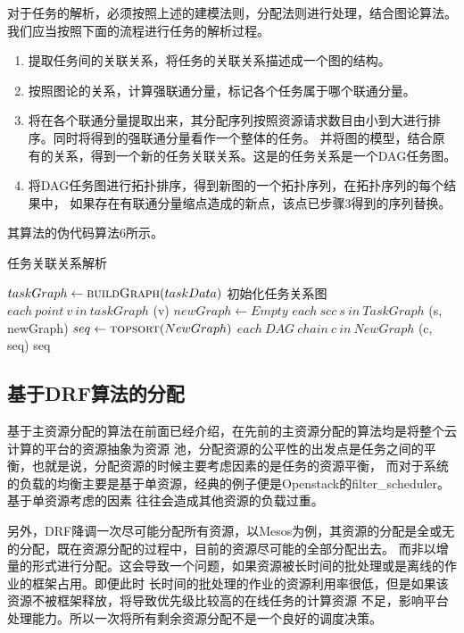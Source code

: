 对于任务的解析，必须按照上述的建模法则，分配法则进行处理，结合图论算法。我们应当按照下面的流程进行任务的解析过程。
\begin{enumerate}
\item 提取任务间的关联关系，将任务的关联关系描述成一个图的结构。
\item 按照图论的关系，计算强联通分量，标记各个任务属于哪个联通分量。
\item 将在各个联通分量提取出来，其分配序列按照资源请求数目由小到大进行排序。同时将得到的强联通分量看作一个整体的任务。
并将图的模型，结合原有的关系，得到一个新的任务关联关系。这是的任务关系是一个DAG任务图。
\item 将DAG任务图进行拓扑排序，得到新图的一个拓扑序列，在拓扑序列的每个结果中，
如果存在有联通分量缩点造成的新点，该点已步骤3得到的序列替换。
\end{enumerate}
其算法的伪代码算法6所示。
\begin{algorithm} 
\caption {任务关联关系解析} 
\begin{codebox}
\li	$taskGraph \leftarrow \textnormal{\scshape buildGraph}(taskData)$ \RComment 初始化任务关系图
\li	\For $each \ point \ v \ in \ taskGraph$    
\li	\Do	
		(v)				
	\End
\li	$newGraph \leftarrow Empty$
\li	\For $each \ scc \ s \ in \ TaskGraph$
\li	\Do
		(s, newGraph)
	\End
\li	$seq \leftarrow \textnormal{\scshape topsort}(NewGraph)$
\li	\For $each \ DAG \ chain \ c \ in \ NewGraph$
\li	\Do	
		(c, seq)
	\End 
\li	\Return seq
\end{codebox}
\end{algorithm} 

\subsection{基于DRF算法的分配}
基于主资源分配的算法在前面已经介绍，在先前的主资源分配的算法均是将整个云计算的平台的资源抽象为资源
池，分配资源的公平性的出发点是任务之间的平衡，也就是说，分配资源的时候主要考虑因素的是任务的资源平衡，
而对于系统的负载的均衡主要是基于单资源，经典的例子便是Openstack的filter\_scheduler。基于单资源考虑的因素
往往会造成其他资源的负载过重。

另外，DRF降调一次尽可能分配所有资源，以Mesos为例，其资源的分配是全或无的分配，既在资源分配的过程中，目前的资源尽可能的全部分配出去。
而非以增量的形式进行分配。这会导致一个问题，如果资源被长时间的批处理或是离线的作业的框架占用。即便此时
长时间的批处理的作业的资源利用率很低，但是如果该资源不被框架释放，将导致优先级比较高的在线任务的计算资源
不足，影响平台处理能力。所以一次将所有剩余资源分配不是一个良好的调度决策。

